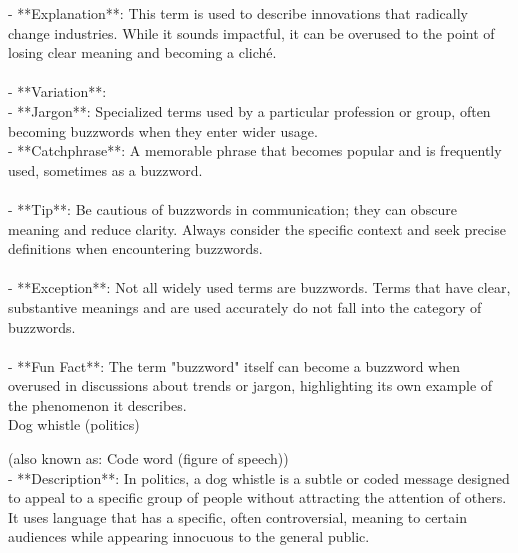 \documentclass[a4paper,12pt,single,pdftex]{scrbook}
\begin{document}
    
        - **Explanation**: This term is used to describe innovations that radically change industries. While it sounds impactful, it can be overused to the point of losing clear meaning and becoming a cliché.
    \\

    
      
    \\

    
      - **Variation**:
    \\

    
        - **Jargon**: Specialized terms used by a particular profession or group, often becoming buzzwords when they enter wider usage.
    \\

    
        - **Catchphrase**: A memorable phrase that becomes popular and is frequently used, sometimes as a buzzword.
    \\

    
      
    \\

    
      - **Tip**: Be cautious of buzzwords in communication; they can obscure meaning and reduce clarity. Always consider the specific context and seek precise definitions when encountering buzzwords.
    \\

    
      
    \\

    
      - **Exception**: Not all widely used terms are buzzwords. Terms that have clear, substantive meanings and are used accurately do not fall into the category of buzzwords.
    \\

    
      
    \\

    
      - **Fun Fact**: The term "buzzword" itself can become a buzzword when overused in discussions about trends or jargon, highlighting its own example of the phenomenon it describes.
    \\

  

Dog whistle (politics)
    
      (also known as: Code word (figure of speech))
    \\

  
    
      - **Description**: In politics, a dog whistle is a subtle or coded message designed to appeal to a specific group of people without attracting the attention of others. It uses language that has a specific, often controversial, meaning to certain audiences while appearing innocuous to the general public.
    \\
\end{document}
